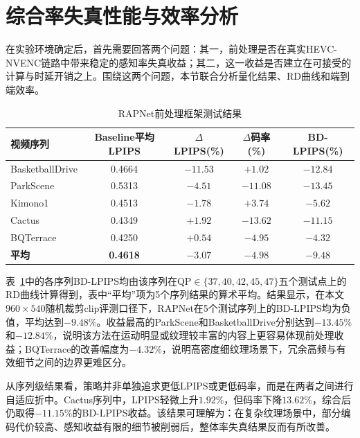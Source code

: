 \section{综合率失真性能与效率分析}

在实验环境确定后，首先需要回答两个问题：其一，前处理是否在真实HEVC-NVENC链路中带来稳定的感知率失真收益；其二，这一收益是否建立在可接受的计算与时延开销之上。围绕这两个问题，本节联合分析量化结果、RD曲线和端到端效率。

\begin{table}[htbp]
  \centering
  \caption{RAPNet前处理框架测试结果}
  \label{tab:bdlpips-results}
  \begin{tabular}{lcccc}
    \toprule
    \textbf{视频序列} & \textbf{Baseline平均LPIPS} & \textbf{$\Delta$LPIPS(\%)} & \textbf{$\Delta$码率(\%)} & \textbf{BD-LPIPS(\%)} \\
    \midrule
    BasketballDrive  & 0.4664 & $-11.53$ & $+1.02$  & $\mathbf{-12.84}$ \\
    ParkScene        & 0.5313 & $-4.51$  & $-11.08$ & $\mathbf{-13.45}$ \\
    Kimono1          & 0.4513 & $-1.78$  & $+3.74$  & $\mathbf{-5.62}$  \\
    Cactus           & 0.4349 & $+1.92$  & $-13.62$ & $\mathbf{-11.15}$ \\
    BQTerrace        & 0.4250 & $+0.54$  & $-4.95$  & $\mathbf{-4.32}$  \\
    \midrule
    \textbf{平均} & \textbf{0.4618} & $\mathbf{-3.07}$ & $\mathbf{-4.98}$ & $\mathbf{-9.48}$ \\
    \bottomrule
  \end{tabular}
\end{table}

表~\ref{tab:bdlpips-results}中的各序列BD-LPIPS均由该序列在QP$\in\{37,40,42,45,47\}$五个测试点上的RD曲线计算得到，表中“平均”项为5个序列结果的算术平均。结果显示，在本文$960\times540$随机裁剪clip评测口径下，RAPNet在5个测试序列上的BD-LPIPS均为负值，平均达到$-9.48\%$。收益最高的ParkScene和BasketballDrive分别达到$-13.45\%$和$-12.84\%$，说明该方法在运动明显或纹理较丰富的内容上更容易体现前处理收益；BQTerrace的改善幅度为$-4.32\%$，说明高密度细纹理场景下，冗余高频与有效细节之间的边界更难区分。

从序列级结果看，策略并非单独追求更低LPIPS或更低码率，而是在两者之间进行自适应折中。Cactus序列中，LPIPS轻微上升$1.92\%$，但码率下降$13.62\%$，综合后仍取得$-11.15\%$的BD-LPIPS收益。该结果可理解为：在复杂纹理场景中，部分编码代价较高、感知收益有限的细节被削弱后，整体率失真结果反而有所改善。

